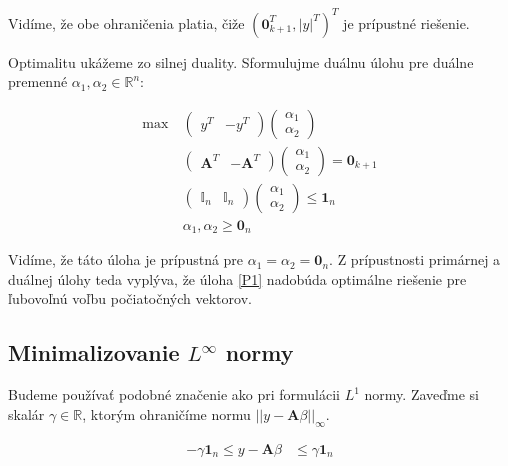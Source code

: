 \documentclass[12pt,oneside,a4paper,slovak]{article}
\begin{document}
\newpage

Vidíme, že obe ohraničenia platia, čiže $\left(\mathbf{0}_{k+1}^T, |y|^T \right)^T$ je prípustné riešenie.

Optimalitu ukážeme zo silnej duality. Sformulujme duálnu úlohu pre duálne premenné $\alpha_1, \alpha_2 \in \mathbb{R}^{n}$:

\begin{align*}
	\text{max}~ &
	\left(
		\begin{array}{c|c}
			y^T & -y^T
		\end{array}
	\right)
	\left(
		\begin{array}{c}
			\alpha_1 \\
			\hline
			\alpha_2
		\end{array}
	\right) \\
	&\left(
		\begin{array}{c|c}
			\mathbf{A}^T & -\mathbf{A}^T
		\end{array}
	\right)
	\left(
		\begin{array}{c}
			\alpha_1 \\
			\hline
			\alpha_2
		\end{array}
	\right)
	=
	\mathbf{0}_{k+1} \\
	&\left(
		\begin{array}{c|c}
			\mathbb{I}_n & \mathbb{I}_n
		\end{array}
	\right)
	\left(
		\begin{array}{c}
			\alpha_1 \\
			\hline
			\alpha_2
		\end{array}
	\right)
	\leq
	\mathbf{1}_{n} \\
	&\alpha_1, \alpha_2 \geq \mathbf{0}_{n} 
\end{align*}

Vidíme, že táto úloha je prípustná pre $\alpha_1 = \alpha_2 = \mathbf{0}_n$. Z prípustnosti primárnej a duálnej úlohy teda vyplýva, že úloha \eqref{P1} nadobúda optimálne riešenie pre ľubovoľnú voľbu počiatočných vektorov.

\subsection*{Minimalizovanie $L^{\infty}$ normy}

Budeme používať podobné značenie ako pri formulácii $L^1$ normy. Zaveďme si skalár $\gamma \in \mathbb{R}$, ktorým ohraničíme normu $||y - \mathbf{A} \beta||_{\infty}$.

\begin{align*}
	-\gamma \mathbf{1}_n \leq y - \mathbf{A} \beta &\leq \gamma \mathbf{1}_n
\end{align*}
\end{document}
